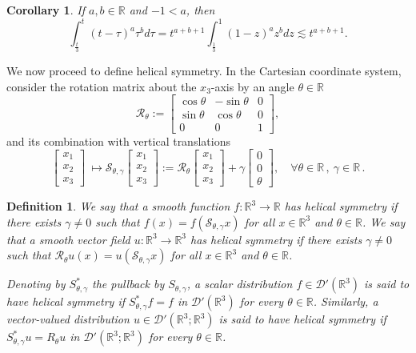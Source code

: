 \documentclass[11pt,a4paper]{article}
\newcommand{\R}{\mathbb{R}}
\newtheorem{cor}[thm]{Corollary}
\newtheorem{defi}[thm]{Definition}
\begin{document}
\begin{cor}\label{cor:intbetatruncated}
If $a,b\in \R$ and $-1<a$, then 
$$\int_{\frac{t}{3}}^t (t-\tau)^a \tau^b d\tau=t^{a+b+1}\int_{\frac{1}{3}}^1 (1-z)^a z^b dz\lesssim  t^{a+b+1}.$$
\end{cor}

We now proceed to define helical symmetry. In the Cartesian coordinate system, consider the rotation matrix about the $x_3$-axis by an angle $\theta\in \mathbb{R}$
	\begin{equation*} \label{rotmat}
		\mathcal{R}_\theta :=
		\begin{bmatrix}
			\cos\theta & -\sin\theta  & 0\\[0.2cm]
			\sin\theta & \cos\theta   & 0\\[0.2cm]
			0          &    0         & 1
		\end{bmatrix},
	\end{equation*}
	and its combination with vertical translations
	$$
	\begin{bmatrix}
		x_1\\
		x_2\\
		x_3
	\end{bmatrix}
	\ \mapsto \mathcal{S}_{\theta,\gamma}\begin{bmatrix}
		x_1\\
		x_2\\
		x_3
	\end{bmatrix}
	:=\mathcal{R}_\theta\begin{bmatrix}
		x_1\\
		x_2\\
		x_3
	\end{bmatrix}+\gamma\begin{bmatrix}
		0\\
		0\\
		\theta
	\end{bmatrix},
	\quad\forall\theta\in\mathbb{R}\, ,\ \gamma \in\R\, .
	$$
\begin{defi}\label{def:helicsym}
We say that a smooth function $f:\mathbb{R}^3\to\mathbb{R}$ has helical symmetry if there exists $\gamma\neq0$ such that $f(x)=f(\mathcal{S}_{\theta,\gamma}x)$ for all $x\in\R^3$ and $\theta\in\mathbb{R}$. We say that a smooth vector field $u:\mathbb{R}^3\to\mathbb{R}^3$ has helical symmetry if there exists $\gamma\neq0$ such that $\mathcal{R}_\theta u(x)=u(\mathcal{S}_{\theta,\gamma}x)$ for all $x\in\R^3$ and $\theta\in\mathbb{R}$.

Denoting by $S_{\theta,\gamma}^{*}$ the pullback by $S_{\theta,\gamma}$, a scalar distribution
$f\in\mathcal{D}'(\mathbb{R}^3)$ is said to have helical symmetry if
$
S_{\theta,\gamma}^{*}f=f$ in $\mathcal{D}'(\mathbb{R}^3)
$
for every $\theta\in\mathbb{R}$. Similarly, a vector-valued distribution
$u\in\mathcal{D}'(\mathbb{R}^3;\mathbb{R}^3)$ is said to have
helical symmetry if
$
S_{\theta,\gamma}^{*}u=R_\theta u$ in $\mathcal{D}'(\mathbb{R}^3;\mathbb{R}^3)
$
for every $\theta\in\mathbb{R}$.
\end{defi}
\end{document}
